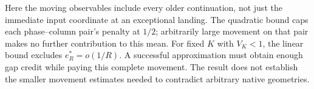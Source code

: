 Here the moving observables include every older continuation, not just
the immediate input coordinate at an exceptional landing. The quadratic bound caps each phase--column pair's penalty at $1/2$;
arbitrarily large movement on that pair makes no further contribution
to this mean.
For fixed $K$ with $V_K<1$, the linear bound excludes
$e_R^*=o(1/R)$. A successful approximation must obtain enough gap credit
while paying this complete movement. The result does not establish the
smaller movement estimates needed to contradict arbitrary native geometries.
